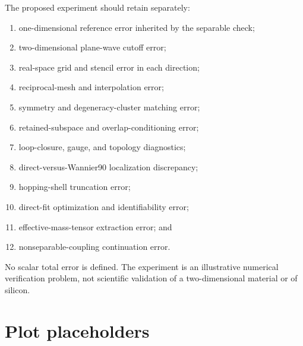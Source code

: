 The proposed experiment should retain separately:
\begin{enumerate}
    \item one-dimensional reference error inherited by the separable check;
    \item two-dimensional plane-wave cutoff error;
    \item real-space grid and stencil error in each direction;
    \item reciprocal-mesh and interpolation error;
    \item symmetry and degeneracy-cluster matching error;
    \item retained-subspace and overlap-conditioning error;
    \item loop-closure, gauge, and topology diagnostics;
    \item direct-versus-Wannier90 localization discrepancy;
    \item hopping-shell truncation error;
    \item direct-fit optimization and identifiability error;
    \item effective-mass-tensor extraction error; and
    \item nonseparable-coupling continuation error.
\end{enumerate}
No scalar total error is defined. The experiment is an illustrative numerical
verification problem, not scientific validation of a two-dimensional material
or of silicon.

\section*{Plot placeholders}

